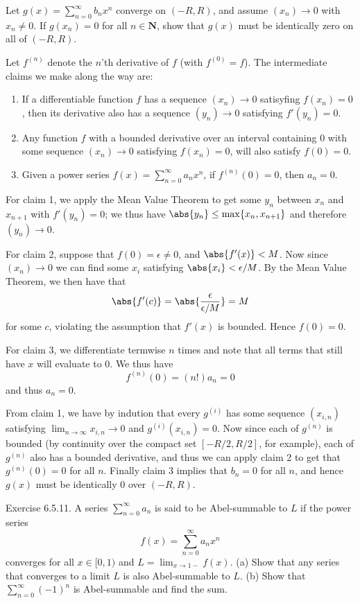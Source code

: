 \begin{exercise}
Let $g(x)=\sum_{n=0}^{\infty} b_{n} x^{n}$ converge on $(-R, R)$, and assume $\left(x_{n}\right) \rightarrow 0$ with $x_{n} \neq 0$. If $g\left(x_{n}\right)=0$ for all $n \in \mathbf{N}$, show that $g(x)$ must be identically zero on all of $(-R, R)$.
\end{exercise}

\begin{solution}
Let \(f^{(n)}\) denote the \(n\)'th derivative of \(f\) (with \(f^{(0)} = f\)). The intermediate claims we make along the way are:
\begin{enumerate}
    \item  If a differentiable function \(f\) has a sequence \((x_n) \to 0\) satisyfing \(f(x_n) = 0\), then its derivative also has a sequence \((y_n) \to 0\) satisfying \(f'(y_n) = 0\).
    \item  Any function \(f\) with a bounded derivative over an interval containing 0 with some sequence \((x_n) \to 0\) satisfying \(f(x_n) = 0\), will also satisfy \(f(0) = 0\).
    \item  Given a power series \(f(x) = \sum^\infty_{n=0}a_nx^n\), if \(f^{(n)}(0) = 0\), then \(a_n = 0\).
\end{enumerate}

For claim 1, we apply the Mean Value Theorem to get some \(y_n\) between \(x_n\) and \(x_{n+1}\) with \(f'(y_n) = 0\); we thus have \(\abs{y_n} \leq \max\{x_n, x_{n+1}\}\) and therefore \((y_n) \to 0\).

For claim 2, suppose that \(f(0) = \epsilon \neq 0\), and \(\abs{f'(x)} < M\). Now since \((x_n) \to 0\) we can find some \(x_i\) satisfying \(\abs{x_i} < \epsilon / M\). By the Mean Value Theorem, we then have that
\[\abs{f'(c)} = \abs{\frac{\epsilon}{\epsilon/M}} = M\]
for some \(c\), violating the assumption that \(f'(x)\) is bounded. Hence \(f(0) = 0\).

For claim 3, we differentiate termwise \(n\) times and note that all terms that still have \(x\) will evaluate to 0. We thus have
\[f^{(n)}(0) = (n!)a_n = 0\]
and thus \(a_n = 0\).

From claim 1, we have by indution that every \(g^{(i)}\) has some sequence \((x_{i,n})\) satisfying \(\lim_{n \to \infty} x_{i,n} \to 0\) and \(g^{(i)}(x_{i,n}) = 0\). Now since each of \(g^{(n)}\) is bounded (by continuity over the compact set \([-R/2, R/2]\), for example), each of \(g^{(n)}\) also has a bounded derivative, and thus we can apply claim 2 to get that \(g^{(n)}(0) = 0\) for all \(n\). Finally claim 3 implies that \(b_n = 0\) for all \(n\), and hence \(g(x)\) must be identically 0 over \((-R, R)\).
\end{solution}

Exercise 6.5.11. A series $\sum_{n=0}^{\infty} a_{n}$ is said to be Abel-summable to $L$ if the power series
$$
f(x)=\sum_{n=0}^{\infty} a_{n} x^{n}
$$
converges for all $x \in[0,1)$ and $L=\lim _{x \rightarrow 1-} f(x)$.
(a) Show that any series that converges to a limit $L$ is also Abel-summable to $L$.
(b) Show that $\sum_{n=0}^{\infty}(-1)^{n}$ is Abel-summable and find the sum.

